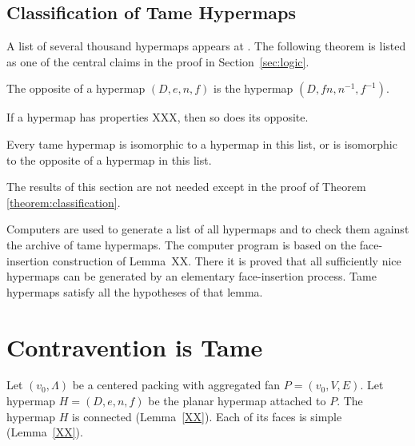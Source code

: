 \subsection{Classification of Tame Hypermaps}
    \label{sec:proof-classification}

\label{sec:classification}

A list of several thousand hypermaps appears at \cite{web}. The
following theorem is listed as one of the central claims in the
proof in Section~\ref{sec:logic}.

\begin{definition} The opposite of a hypermap $(D,e,n,f)$ is the
hypermap $(D,f n,n^{-1},f^{-1})$.
\end{definition}

\begin{lemma} If a hypermap has properties XXX, then so does its
opposite.
\end{lemma}

\begin{theorem}
\label{theorem:classification} Every tame hypermap is isomorphic to
a hypermap in this list, or is isomorphic to the opposite of a
hypermap in this list.
\end{theorem}

The results of this section are not needed except in the proof of
Theorem \ref{theorem:classification}.

\smallskip

Computers are used to generate a list of all hypermaps and to check
them against the archive of tame hypermaps.  The computer program is
based on the face-insertion construction of Lemma~XX.  There it is
proved that all sufficiently nice hypermaps can be generated by an
elementary face-insertion process.  Tame hypermaps satisfy all the
hypotheses of that lemma.





\section{Contravention is Tame}
    \label{sec:contraproof}

Let $(v_0,\Lambda)$ be a centered packing with
aggregated fan $P=(v_0,V,E)$.  Let  hypermap $H=(D,e,n,f)$
be the planar hypermap attached to $P$.
The hypermap $H$ is connected (Lemma~\ref{XX}).  Each of its
faces is simple (Lemma~\ref{XX}).

